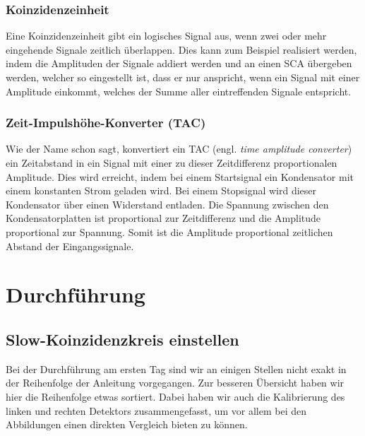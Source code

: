 \subsection{Koinzidenzeinheit}

Eine Koinzidenzeinheit gibt ein logisches Signal aus, wenn zwei oder mehr
eingehende Signale zeitlich überlappen. Dies kann zum Beispiel realisiert
werden, indem die Amplituden der Signale addiert werden und an einen SCA
übergeben werden, welcher so eingestellt ist, dass er nur anspricht, wenn ein
Signal mit einer Amplitude einkommt, welches der Summe aller eintreffenden
Signale entspricht.

\subsection{Zeit-Impulshöhe-Konverter (TAC)}

Wie der Name schon sagt, konvertiert ein TAC (engl. \emph{time amplitude
converter}) ein Zeitabstand in ein Signal mit einer zu dieser Zeitdifferenz
proportionalen Amplitude. Dies wird erreicht, indem bei einem Startsignal ein
Kondensator mit einem konstanten Strom geladen wird. Bei einem Stopsignal wird
dieser Kondensator über einen Widerstand entladen. Die Spannung zwischen den
Kondensatorplatten ist proportional zur Zeitdifferenz und die Amplitude
proportional zur Spannung. Somit ist die Amplitude proportional zeitlichen
Abstand der Eingangssignale.


\chapter{Durchführung}

\section{Slow-Koinzidenzkreis einstellen}

Bei der Durchführung am ersten Tag sind wir an einigen Stellen nicht exakt in
der Reihenfolge der Anleitung vorgegangen. Zur besseren Übersicht haben wir
hier die Reihenfolge etwas sortiert. Dabei haben wir auch die Kalibrierung des
linken und rechten Detektors zusammengefasst, um vor allem bei den Abbildungen
einen direkten Vergleich bieten zu können.

